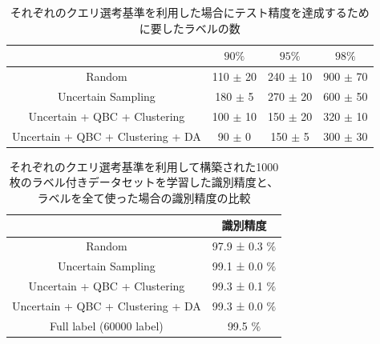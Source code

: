 \begin{table}[h]
    \caption{\label{table:mnist_samplenum_accuracy}それぞれのクエリ選考基準を利用した場合にテスト精度を達成するために要したラベルの数}
    \center
    \begin{tabular}{c|c|c|c} 
         & $90\%$ & $95\%$ & $98\%$ \\ \hline
        Random & 110 $\pm$ 20 & 240 $\pm$ 10 & 900 $\pm$ 70 \\
        Uncertain Sampling & 180 $\pm$ 5 & 270 $\pm$ 20  & 600 $\pm$ 50 \\
        Uncertain + QBC + Clustering & 100 $\pm$ 10 & 150 $\pm$ 20 & 320 $\pm$ 10 \\ 
        Uncertain + QBC + Clustering + DA & 90 $\pm$ 0 & 150 $\pm$ 5 & 300 $\pm$ 30 \\

    \end{tabular}
\end{table}

\begin{table}[h]
    \caption{\label{table:mnist_last_accuracy}それぞれのクエリ選考基準を利用して構築された1000枚のラベル付きデータセットを学習した識別精度と、ラベルを全て使った場合の識別精度の比較}
    \center
    \begin{tabular}{c|c} 
         &  識別精度 \\ \hline
        Random & 97.9 ± 0.3  $\%$ \\
        Uncertain Sampling & 99.1 ± 0.0 $\%$  \\
        Uncertain + QBC + Clustering & 99.3 ± 0.1  $\%$ \\ 
        Uncertain + QBC + Clustering + DA & 99.3 ± 0.0  $\%$ \\ \hline
        Full label (60000 label) & 99.5 $\%$
    \end{tabular}
\end{table}

